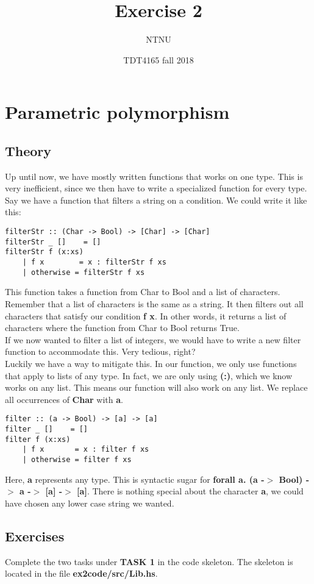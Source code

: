 \documentclass{article}
\title{Exercise 2}
\author{NTNU}
\date{TDT4165 fall 2018}
\begin{document}
\maketitle

\section{Parametric polymorphism}
\subsection{Theory}
Up until now, we have mostly written functions that works on one type. This is very inefficient, since we then have to write a specialized function for every type. Say we have a function that filters a string on a condition. We could write it like this:
\lstset{language=Haskell}
\begin{lstlisting}
filterStr :: (Char -> Bool) -> [Char] -> [Char]
filterStr _ []    = []
filterStr f (x:xs)
    | f x        = x : filterStr f xs
    | otherwise = filterStr f xs
\end{lstlisting}
This function takes a function from Char to Bool and a list of characters. Remember that a list of characters is the same as a string. It then filters out all characters that satisfy our condition \textbf{f x}. In other words, it returns a list of characters where the function from Char to Bool returns True.\\
If we now wanted to filter a list of integers, we would have to write a new filter function to accommodate this. Very tedious, right?\\
Luckily we have a way to mitigate this. In our function, we only use functions that apply to lists of any type. In fact, we are only using \textbf{(:)}, which we know works on any list. This means our function will also work on any list. We replace all occurrences of \textbf{Char} with \textbf{a}.
\begin{lstlisting}
filter :: (a -> Bool) -> [a] -> [a]
filter _ []    = []
filter f (x:xs)
    | f x       = x : filter f xs
    | otherwise = filter f xs
\end{lstlisting}
Here, \textbf{a} represents any type. This is syntactic sugar for \textbf{forall a. (a -$>$ Bool) -$>$ a -$>$ [a] -$>$ [a]}. There is nothing special about the character \textbf{a}, we could have chosen any lower case string we wanted.

\subsection{Exercises}
Complete the two tasks under \textbf{TASK 1} in the code skeleton. The skeleton is located in the file \textbf{ex2code/src/Lib.hs}.
\end{document}
